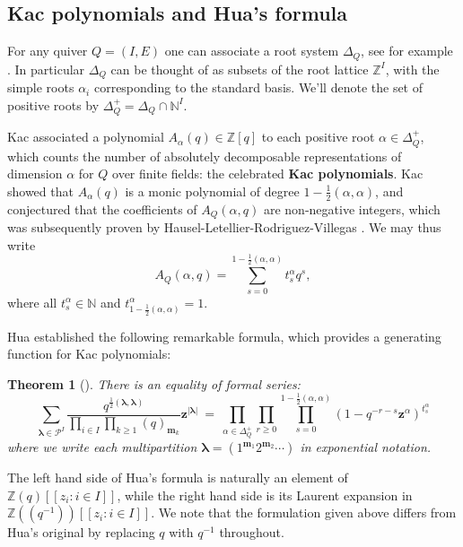 \documentclass[11pt,reqno]{amsart}
\renewcommand{\mathbf}{\mathbold}
\numberwithin{equation}{section}
\newtheorem{Theorem}[equation]{Theorem}
\theoremstyle{definition}
\newcommand{\cP}{\mathcal{P}}
\newcommand{\bm}{\mathbf{m}}
\newcommand{\bz}{\mathbf{z}}
\newcommand{\NN}{\mathbb{N}}
\newcommand{\ZZ}{\mathbb{Z}}
\newcommand{\vertexset}{I}
\newcommand{\arrowset}{E}
\newcommand{\Partitions}{\cP}
\newcommand{\bla}{{\boldsymbol{\lambda}}}
\begin{document}
\subsection{Kac polynomials and Hua's formula}
\label{ssec: Kac and Hua}
For any quiver $Q = (\vertexset, \arrowset)$ one can associate a root system $\Delta_Q$, see for example \cite[\S 1.1]{Kac2}.  In particular $\Delta_Q$ can be thought of as subsets of the root lattice $\ZZ^\vertexset$, with the simple roots $\alpha_i$ corresponding to the standard basis. We'll denote the set of positive roots by $\Delta_Q^+ = \Delta_Q \cap \NN^\vertexset$.

Kac \cite[Proposition 1.15]{Kac2} associated a polynomial $A_\alpha( q) \in \ZZ[q]$ to each positive root $\alpha \in \Delta_Q^+$, which counts the number of absolutely decomposable representations of dimension $\alpha$ for $Q$ over finite fields: the celebrated \textbf{Kac polynomials}.   Kac showed that $A_\alpha(q)$ is a monic polynomial of degree $1 - \frac{1}{2}(\alpha,\alpha)$, and  conjectured that the coefficients of $A_Q(\alpha,q)$ are non-negative integers, which was subsequently proven by Hausel-Letellier-Rodriguez-Villegas \cite{HLRV}.
We may thus  write 
\begin{equation}
    \label{eq:KacPolynomials}
    A_Q(\alpha, q) = \sum_{s=0}^{1-\frac{1}{2}(\alpha,\alpha)} t_s^\alpha q^s,
\end{equation}
where all $t_s^\alpha \in \NN$ and $t_{1-\frac{1}{2}(\alpha,\alpha)}^\alpha = 1$.

Hua established the following remarkable formula, which provides a generating function for Kac polynomials:

\begin{Theorem}[\mbox{\cite[Theorem 4.9]{Hua}}]
There is an equality of formal series:
$$
\sum_{\bla \in \Partitions^\vertexset} \frac{q^{\frac{1}{2}(\bla, \bla)}}{\prod_{i\in \vertexset} \prod_{k\geq 1} (q)_{\bm_k} }\bz^{|\bla|} \ = \ \prod_{\alpha \in \Delta_Q^+} \prod_{r\geq 0} \prod_{s=0}^{1 - \frac{1}{2} (\alpha,\alpha)} ( 1 -  q^{-r-s} \bz^\alpha)^{t_s^\alpha} 
$$
where we write each multipartition $\bla = (1^{\bm_1} 2^{\bm_2}\cdots)$ in exponential notation.
\end{Theorem}
The left hand side of Hua's formula is naturally an element of $\ZZ(q)[\![z_i : i \in \vertexset]\!]$, while the right hand side is its Laurent expansion in $\ZZ(\!(q^{-1})\!)[\![z_i : i \in \vertexset]\!]$. We note that the  formulation given above differs from Hua's original by replacing  $q$ with $q^{-1}$ throughout.
\end{document}
